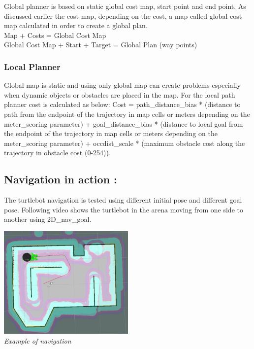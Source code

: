 \documentclass[10pt,a4paper]{article}
\begin{document}
Global planner is based on static global cost map, start point and end point. As discussed earlier the cost map, depending on the cost, a map called global cost map calculated in order to create a global plan.   \\

Map + Costs = Global Cost Map \\
Global Cost Map + Start + Target = Global Plan (way points) \\

\subsubsection{Local Planner}

Global map is static and using only global map can create problems especially when dynamic objects or obstacles are placed in the map. 
For the local path planner cost is calculated as below:
Cost = path\_distance\_bias * (distance to path from the endpoint of the trajectory in map cells or meters depending on the meter\_scoring parameter) + goal\_distance\_bias * (distance to local goal from the endpoint of the trajectory in map cells or meters depending on the meter\_scoring parameter) + occdist\_scale * (maximum obstacle cost along the trajectory in obstacle cost (0-254)).\\

\subsection{Navigation in action :}
The turtlebot navigation is tested using different initial pose and different goal pose. Following video shows the turtlebot in the arena moving from one side to another using 2D\_nav\_goal. \\

\begin{center}
\includegraphics[width=0.5\textwidth]{images/nav_screen.png}\\
\textit{Example of navigation}
\end{center}
\end{document}
